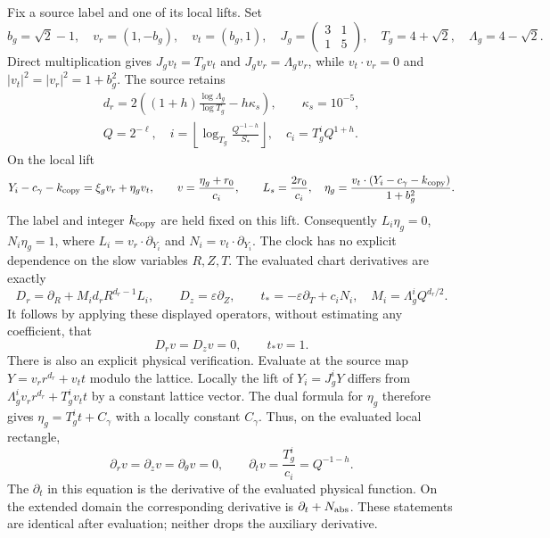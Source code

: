 Fix a source label and one of its local lifts. Set
\[
 b_g=\sqrt2-1,\quad v_r=(1,-b_g),\quad v_t=(b_g,1),\quad
 J_g=\begin{pmatrix}3&1\\1&5\end{pmatrix},\quad
 T_g=4+\sqrt2,\quad\Lambda_g=4-\sqrt2.
\]
Direct multiplication gives $J_gv_t=T_gv_t$ and
$J_gv_r=\Lambda_gv_r$, while $v_t\cdot v_r=0$ and
$|v_t|^2=|v_r|^2=1+b_g^2$. The source retains
\[
\begin{gathered}
 d_r=2\left((1+h)\frac{\log\Lambda_g}{\log T_g}-h\kappa_s\right),\qquad
 \kappa_s=10^{-5},\\
 Q=2^{-\ell},\quad
 i=\left\lfloor\log_{T_g}\frac{Q^{-1-h}}{S_*}\right\rfloor,\quad
 c_i=T_g^iQ^{1+h}.
\end{gathered}
\]
On the local lift
\[
 Y_i-c_\gamma-k_{\rm copy}=\xi_gv_r+\eta_gv_t,\qquad
 v=\frac{\eta_g+r_0}{c_i},\qquad L_s=\frac{2r_0}{c_i},
 \quad
 \eta_g=\frac{v_t\cdot(Y_i-c_\gamma-k_{\rm copy})}{1+b_g^2}.
\]
The label and integer $k_{\rm copy}$ are held fixed on this lift.
Consequently $L_i\eta_g=0$, $N_i\eta_g=1$, where
$L_i=v_r\cdot\partial_{Y_i}$ and $N_i=v_t\cdot\partial_{Y_i}$.
The clock has no explicit dependence on the slow variables $R,Z,T$.
The evaluated chart derivatives are exactly
\[
 D_r=\partial_R+M_id_rR^{d_r-1}L_i,\qquad
 D_z=\varepsilon\partial_Z,\qquad
 t_*=-\varepsilon\partial_T+c_iN_i,
 \quad M_i=\Lambda_g^iQ^{d_r/2}.
\]
It follows by applying these displayed operators, without estimating
any coefficient, that
\begin{equation}\label{tgframe:clockchart}
 D_rv=D_zv=0,\qquad t_*v=1.
\end{equation}
There is also an explicit physical verification. Evaluate at the
source map $Y=v_rr^{d_r}+v_tt$ modulo the lattice. Locally the lift of
$Y_i=J_g^iY$ differs from
$\Lambda_g^iv_rr^{d_r}+T_g^iv_tt$ by a constant lattice vector.
The dual formula for $\eta_g$ therefore gives
$\eta_g=T_g^it+C_\gamma$ with a locally constant $C_\gamma$.
Thus, on the evaluated local rectangle,
\begin{equation}\label{tgframe:clockphysical}
 \partial_rv=\partial_zv=\partial_\theta v=0,\qquad
 \partial_tv=\frac{T_g^i}{c_i}=Q^{-1-h}.
\end{equation}
The $\partial_t$ in this equation is the derivative of the evaluated
physical function. On the extended domain the corresponding derivative
is $\partial_t+N_{\rm abs}$. These statements are identical after
evaluation; neither drops the auxiliary derivative.

